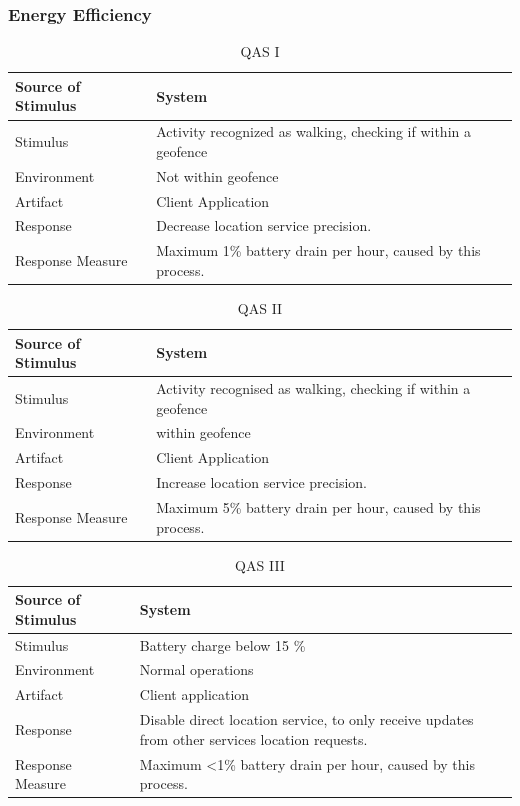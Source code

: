 \subsubsection{Energy Efficiency}
\begin{table}[H]
\centering
\caption{QAS I}
\label{tab:qasI}
\begin{tabularx}{\textwidth}{|l|X|}
\hline
Source of Stimulus & System \\ \hline
Stimulus & Activity recognized as walking, checking if within a geofence \\ \hline
Environment & Not within geofence \\ \hline
Artifact & Client Application \\ \hline
Response & Decrease location service precision. \\ \hline
Response Measure & Maximum 1\% battery drain per hour, caused by this process. \\ \hline
\end{tabularx}
\end{table}
\begin{table}[H]
\centering
\caption{QAS II}
\label{tab:qasII}
\begin{tabularx}{\textwidth}{|l|X|}
\hline
Source of Stimulus & System \\ \hline
Stimulus & Activity recognised as walking, checking if within a geofence \\ \hline
Environment & within geofence \\ \hline
Artifact & Client Application \\ \hline
Response & Increase location service precision. \\ \hline
Response Measure & Maximum 5\% battery drain per hour, caused by this process. \\ \hline
\end{tabularx}
\end{table}

\begin{table}[H]
\centering
\caption{QAS III}
\label{tab:qasIII}
\begin{tabularx}{\textwidth}{|l|X|}
\hline
Source of Stimulus & System \\ \hline
Stimulus & Battery charge below 15 \% \\ \hline
Environment & Normal operations \\ \hline
Artifact & Client application \\ \hline
Response & Disable direct location service, to only receive updates from other services location requests. \\ \hline
Response Measure & Maximum \textless1\% battery drain per hour, caused by this process. \\ \hline
\end{tabularx}
\end{table}

